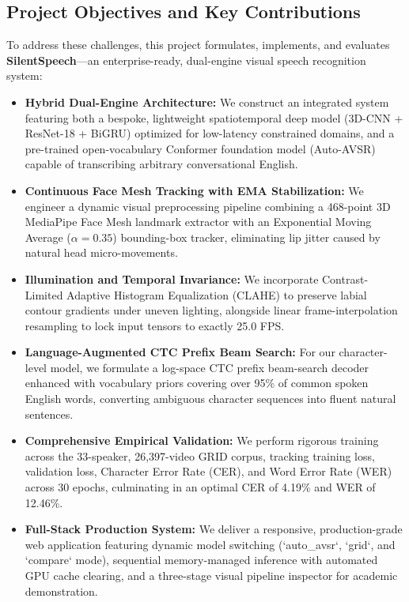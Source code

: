 \documentclass[conference,compsoc,10pt]{IEEEtran}
\begin{document}
\subsection{Project Objectives and Key Contributions}
To address these challenges, this project formulates, implements, and evaluates \textbf{SilentSpeech}---an enterprise-ready, dual-engine visual speech recognition system:
\begin{itemize}
    \item \textbf{Hybrid Dual-Engine Architecture:} We construct an integrated system featuring both a bespoke, lightweight spatiotemporal deep model (3D-CNN + ResNet-18 + BiGRU) optimized for low-latency constrained domains, and a pre-trained open-vocabulary Conformer foundation model (Auto-AVSR) capable of transcribing arbitrary conversational English.
    \item \textbf{Continuous Face Mesh Tracking with EMA Stabilization:} We engineer a dynamic visual preprocessing pipeline combining a 468-point 3D MediaPipe Face Mesh landmark extractor with an Exponential Moving Average ($\alpha=0.35$) bounding-box tracker, eliminating lip jitter caused by natural head micro-movements.
    \item \textbf{Illumination and Temporal Invariance:} We incorporate Contrast-Limited Adaptive Histogram Equalization (CLAHE) to preserve labial contour gradients under uneven lighting, alongside linear frame-interpolation resampling to lock input tensors to exactly 25.0 FPS.
    \item \textbf{Language-Augmented CTC Prefix Beam Search:} For our character-level model, we formulate a log-space CTC prefix beam-search decoder enhanced with vocabulary priors covering over 95\% of common spoken English words, converting ambiguous character sequences into fluent natural sentences.
    \item \textbf{Comprehensive Empirical Validation:} We perform rigorous training across the 33-speaker, 26,397-video GRID corpus, tracking training loss, validation loss, Character Error Rate (CER), and Word Error Rate (WER) across 30 epochs, culminating in an optimal CER of 4.19\% and WER of 12.46\%.
    \item \textbf{Full-Stack Production System:} We deliver a responsive, production-grade web application featuring dynamic model switching (`auto\_avsr`, `grid`, and `compare` mode), sequential memory-managed inference with automated GPU cache clearing, and a three-stage visual pipeline inspector for academic demonstration.
\end{itemize}
\end{document}
